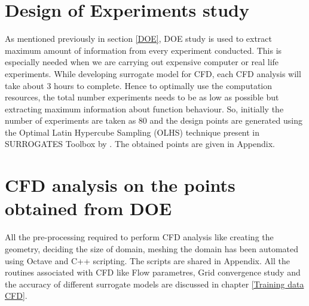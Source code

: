 \section{Design of Experiments study}

As mentioned previously in section \ref{DOE}, DOE study is used to extract maximum amount of information from every experiment conducted. This is especially needed when we are carrying out expensive computer or real life experiments. While developing surrogate model for CFD, each CFD analysis will take about 3 hours to complete. Hence to optimally use the computation resources, the total number experiments needs to be as low as possible but extracting maximum information about function behaviour. So, initially the number of experiments are taken as 80 and the design points are generated using the Optimal Latin Hypercube Sampling (OLHS) technique present in SURROGATES Toolbox by \cite{viana2014metamodeling}. The obtained points are given in Appendix.

\section{CFD analysis on the points obtained from DOE}
\label{Three surrogate models}

All the pre-processing required to perform CFD analysis like creating the geometry, deciding the size of domain, meshing the domain has been automated using Octave and C++ scripting. The scripts are shared in Appendix. All the routines associated with CFD like Flow parametres, Grid convergence study and the accuracy of different surrogate models are discussed in chapter \ref{Training data CFD}.







